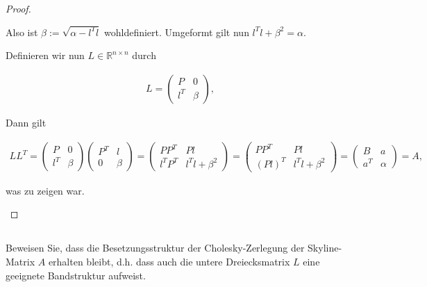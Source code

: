 \documentclass[titlepage]{article}
\begin{document}
\begin{proof}
\begin{itemize}
		Also ist $\beta := \sqrt{\alpha - l^Tl}$ wohldefiniert. Umgeformt gilt nun $l^Tl + \beta^2 = \alpha$.
		
		Definieren wir nun $L \in \mathbb{R}^{n\times n}$ durch
		
		\begin{align*}
			L = \begin{pmatrix}
				P & 0 \\
				l^T & \beta
			\end{pmatrix},
		\end{align*}
	
		Dann gilt
		
		\begin{align*}
			LL^T = \begin{pmatrix}
				P & 0 \\
				l^T & \beta
			\end{pmatrix} \begin{pmatrix}
				P^T & l \\
				0 & \beta
			\end{pmatrix} = \begin{pmatrix}
				PP^T & Pl \\
				l^TP^T & l^Tl+\beta^2
			\end{pmatrix} = \begin{pmatrix}
				PP^T & Pl \\
				(Pl)^T & l^Tl+\beta^2
			\end{pmatrix} = \begin{pmatrix}
				B & a \\
				a^T & \alpha
			\end{pmatrix} = A,
		\end{align*}
	
		was zu zeigen war.
	\end{itemize}
	
\end{proof}


\subsection{}
Beweisen Sie, dass die Besetzungsstruktur der Cholesky-Zerlegung der Skyline-Matrix $A$ erhalten bleibt, d.h. dass auch die untere Dreiecksmatrix $L$ eine geeignete Bandstruktur aufweist.
\end{document}
